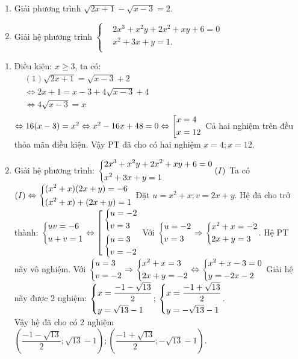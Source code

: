 \begin{ex}%
 \hfill
    \begin{enumerate}
        \item Giải phương trình  $\sqrt{2x+1}-\sqrt{x-3}=2$. 
        \item Giải hệ phương trình  $\begin{cases} & 2x^3+x^2y+2x^2+xy+6=0 \\  & x^2+3x+y=1. \\  \end{cases} $
    \end{enumerate}
\loigiai
    {
    \begin{enumerate}
        \item Điều kiện: $x\geq 3$, ta có: \\
      $\begin{aligned}
        &(1)\sqrt{2x+1}=\sqrt{x-3}+2\  \\ 
        &\Leftrightarrow 2x+1=x-3+4\sqrt{x-3}+4 \\ 
        &\Leftrightarrow 4\sqrt{x-3}=x \\ 
        \end{aligned}$\\
    $\Leftrightarrow 16(x-3)=x^2\Leftrightarrow x^2-16x+48=0\Leftrightarrow \left[\begin{aligned}&x=4 \\&x=12\end{aligned}\right.$ 
      Cả hai nghiệm trên đều thỏa mãn điều kiện. 
      	Vậy PT đã cho có hai nghiệm $x=4; x=12. $
        \item Giải hệ phương trình: $\left\{\begin{aligned}&2x^3+x^2y+2x^2+xy+6=0\\&x^2+3x+y=1\end{aligned}\right. (I)$
        Ta có $(I)\Leftrightarrow \left\{\begin{aligned}&(x^2+x)(2x+y)=-6\\  &(x^2+x)+(2x+y)=1\end{aligned}\right. $
        Đặt $u=x^2+x;v=2x+y$. Hệ đã cho trở thành: 
        $\left\{\begin{aligned}& uv=-6\\& u+v=1\end{aligned}\right. \Leftrightarrow \left[\begin{aligned}
        & \left\{\begin{aligned}& u=-2 \\  & v=3\end{aligned}\right.\\ 
        & \left\{\begin{aligned}& u=3 \\  & v=-2\end{aligned}\right. 
        \end{aligned}\right.$
        Với $\left\{\begin{aligned}& u=-2 \\  & v=3\end{aligned}\right. \Rightarrow \left\{\begin{aligned}& x^2+x=-2\\ & 2x+y=3\end{aligned}\right.$. Hệ PT này vô nghiệm. 
        Với $\left\{\begin{aligned}&u=3\\& v=-2\end{aligned}\right.\Rightarrow \left\{\begin{aligned}& x^2+x=3 \\  & 2x+y=-2\end{aligned}\right. \Leftrightarrow \left\{\begin{aligned}& x^2+x-3=0 \\  & y=-2x-2\end{aligned}\right.$ 
        Giải hệ này được 2 nghiệm: $\left\{\begin{aligned}& x=\dfrac{-1-\sqrt{13}}{2} \\  & y=\sqrt{13}-1\end{aligned}\right.$; $\left\{\begin{aligned} & x=\dfrac{-1+\sqrt{13}}{2} \\  & y=-\sqrt{13}-1\end{aligned}\right.$. \\
        Vậy hệ đã cho có 2 nghiệm $(\dfrac{-1-\sqrt{13}}{2}; \sqrt{13}-1); (\dfrac{-1+\sqrt{13}}{2}; -\sqrt{13}-1)$.
  \end{enumerate}
    }
\end{ex}

